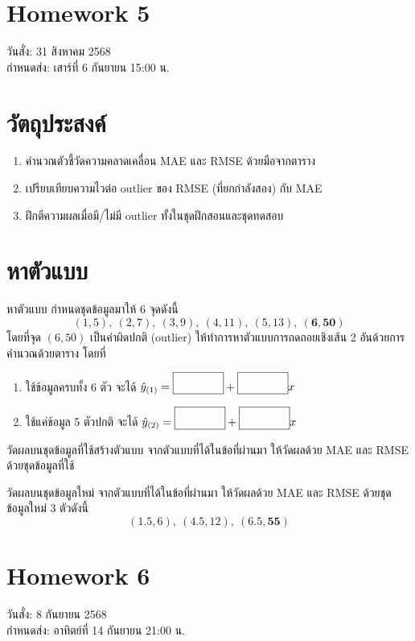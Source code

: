 \newpage
\section*{Homework 5}
วันสั่ง: 31 สิงหาคม 2568\\
กำหนดส่ง: เสาร์ที่ 6 กันยายน 15:00 น.

\section*{วัตถุประสงค์}
\begin{enumerate}
	\item คำนวณตัวชี้วัดความคลาดเคลื่อน MAE และ RMSE ด้วยมือจากตาราง
	\item เปรียบเทียบความไวต่อ outlier ของ RMSE (ที่ยกกำลังสอง) กับ MAE
	\item ฝึกตีความผลเมื่อมี/ไม่มี outlier ทั้งในชุดฝึกสอนและชุดทดสอบ
\end{enumerate}

\section*{หาตัวแบบ}
\begin{exercise}
	{หาตัวแบบ}{}
	กำหนดชุดข้อมูลมาให้ 6 จุดดังนี้
	\[
	(1,5),\ (2,7),\ (3,9),\ (4,11),\ (5,13),\ \mathbf{(6,50)}
	\]
	โดยที่จุด $(6,50)$ เป็นค่าผิดปกติ (outlier)
	ให้ทำการหาตัวแบบการถดถอยเชิงเส้น 2 อันด้วยการคำนวณด้วยตาราง โดยที่
	\begin{enumerate}
		\item ใช้ข้อมูลครบทั้ง 6 ตัว จะได้ $\hat{y}_{(1)} = \blank{1cm} + \blank{1cm}x$
		\item ใช้แค่ข้อมูล 5 ตัวปกติ จะได้ $\hat{y}_{(2)} = \blank{1cm} + \blank{1cm}x$
	\end{enumerate}
\end{exercise}

\begin{exercise}
	{วัดผลบนชุดข้อมูลที่ใช้สร้างตัวแบบ}{}
	จากตัวแบบที่ได้ในข้อที่ผ่านมา ให้วัดผลด้วย MAE และ RMSE ด้วยชุดข้อมูลที่ใช้
\end{exercise}

\begin{exercise}
	{วัดผลบนชุดข้อมูลใหม่}{}
	จากตัวแบบที่ได้ในข้อที่ผ่านมา ให้วัดผลด้วย MAE และ RMSE ด้วยชุดข้อมูลใหม่ 3 ตัวดังนี้
	\[
	(1.5,6),\ (4.5,12),\ \mathbf{(6.5,55)}
	\]
\end{exercise}

\newpage
\section*{Homework 6}
วันสั่ง: 8 กันยายน 2568\\
กำหนดส่ง: อาทิตย์ที่ 14 กันยายน 21:00 น.

